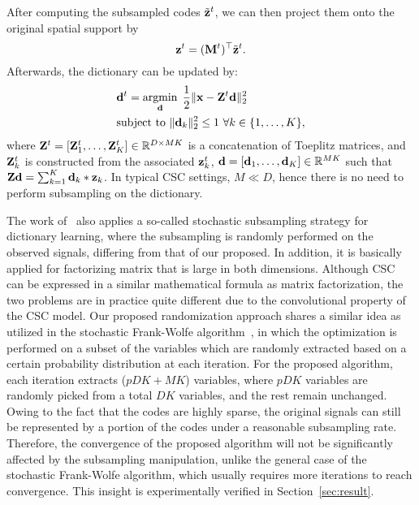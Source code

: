 After computing the subsampled codes $\subcode^\ite$, we can then project them
onto the original spatial support by
\begin{equation} \label{eq:upsampleCode}
    \code^\ite = (\mask^{\ite})^\top \subcode^\ite.
\end{equation}
Afterwards, the dictionary can be updated by:
\begin{equation} \label{eq:updatingFilter}
\begin{split}
   & \filter^{\ite} = \minimize{\filter} \frac{1}{2}\|\signal - \Code^{\ite} \filter \|_2^2 \\
   & \text{subject to}  ~ \|\filter_k\|^2_2 \leq 1 ~ \forall k \in \{1,\dots,K\},
\end{split}
\end{equation}
where $\Code^{\ite}= [\Code_1^{\ite}, \dots, \Code_K^{\ite}]
\in \mathbb{R}^{D \times MK}$ is a concatenation of Toeplitz matrices,
and $\Code_k^{\ite}$ is constructed from the associated $\code_k^{\ite}$, $\filter=
[\filter_1,\dots,\filter_K] \in \mathbb{R}^{MK}$ such that $ \Code
\filter = \sum_{k=1}^{K} \filter_k * \code_k$. In typical CSC
settings, $M \ll D$, hence there is no need to perform subsampling on
the dictionary.

The work of~\cite{mensch2016dictionary} also applies a so-called
stochastic subsampling strategy for dictionary learning, where the
subsampling is randomly performed on the observed signals, differing
from that of our proposed. In addition, it is basically applied for
factorizing matrix that is large in both dimensions. Although CSC can
be expressed in a similar mathematical formula as matrix factorization, the two
problems are in practice quite different due to the convolutional
property of the CSC model. Our proposed randomization
approach shares a similar idea as utilized in the stochastic Frank-Wolfe
algorithm~\cite{reddi2016stochastic,pmlr-v80-kerdreux18a}, in which
the optimization is performed on a subset of the variables which are
randomly extracted based on a certain probability distribution at each
iteration. For the proposed algorithm, each iteration extracts
($pDK+MK$) variables, where $pDK$ variables are randomly picked from a
total $DK$ variables, and the rest remain unchanged. Owing to the fact
that the codes are highly sparse, the original signals can still be
represented by a portion of the codes under a reasonable subsampling
rate. Therefore, the convergence of the proposed algorithm will not be
significantly affected by the subsampling manipulation, unlike the
general case of the stochastic Frank-Wolfe algorithm, which usually
requires more iterations to reach convergence. This insight is
experimentally verified in Section~\ref{sec:result}.

